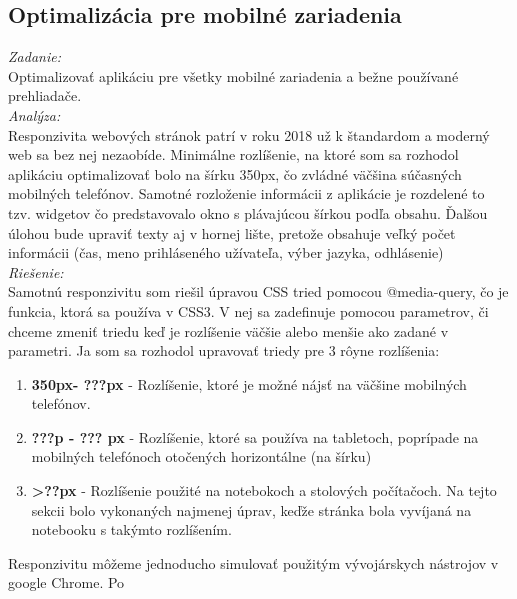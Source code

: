 \documentclass[11pt, oneside]{report}
\begin{document}
\subsection*{Optimalizácia pre mobilné zariadenia}
\textit{Zadanie:}\\
Optimalizovať aplikáciu pre všetky mobilné zariadenia a bežne používané prehliadače.
\\\textit{Analýza:}\\
Responzivita webových stránok patrí v roku 2018 už k štandardom a moderný web sa bez nej nezaobíde. Minimálne rozlíšenie, na ktoré som sa rozhodol aplikáciu optimalizovať  bolo na šírku  350px, čo zvládné väčšina súčasných mobilných telefónov.  Samotné rozloženie  informácii z aplikácie je rozdelené to tzv. widgetov čo predstavovalo okno s plávajúcou šírkou podľa obsahu. Ďalšou úlohou bude upraviť  texty aj v hornej lište, pretože obsahuje veľký počet informácii (čas, meno prihláseného užívateľa, výber jazyka, odhlásenie)
\\\textit{Riešenie:}\\
Samotnú responzivitu som riešil  úpravou CSS tried pomocou \textsf{@media-query}, čo je funkcia, ktorá sa používa v CSS3. V nej sa zadefinuje pomocou parametrov, či chceme zmeniť triedu keď je rozlíšenie väčšie alebo menšie ako zadané v parametri. Ja som sa rozhodol upravovať triedy pre 3 rôyne rozlíšenia:
\begin{enumerate}
\item \textbf{350px- ???px} - Rozlíšenie, ktoré je možné nájsť na väčšine mobilných telefónov.
\item \textbf{???p - ??? px} -  Rozlíšenie, ktoré sa používa na tabletoch, poprípade na mobilných telefónoch otočených horizontálne (na šírku)
\item \textbf{>??px} -  Rozlíšenie použité na notebokoch a stolových počítačoch. Na tejto sekcii bolo vykonaných najmenej úprav, keďže stránka bola vyvíjaná na notebooku s takýmto rozlíšením.
\end{enumerate}
Responzivitu môžeme jednoducho simulovať použitým vývojárskych nástrojov  v google Chrome.  Po 
\end{document}
